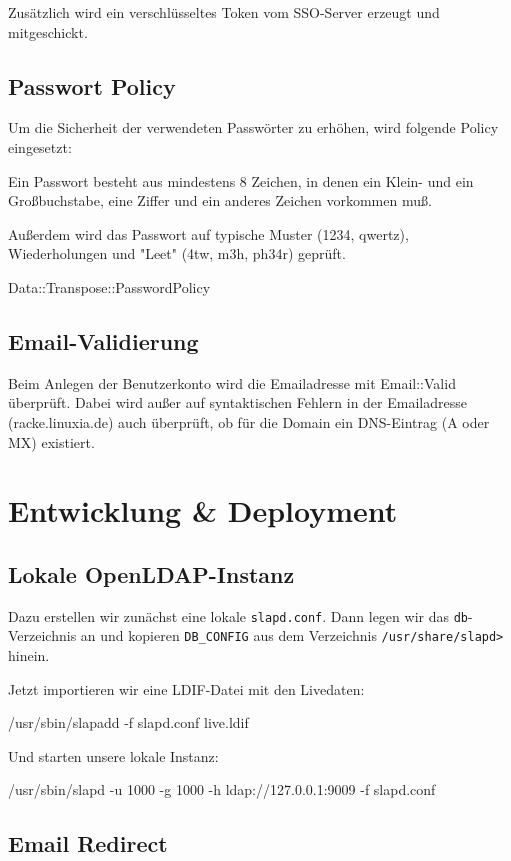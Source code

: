 Zusätzlich wird ein verschlüsseltes Token vom SSO-Server
erzeugt und mitgeschickt.                       
                       
\subsection{Passwort Policy}

Um die Sicherheit der verwendeten Passwörter zu erhöhen, wird
folgende Policy eingesetzt:

Ein Passwort besteht aus mindestens 8 Zeichen, in denen
ein Klein- und ein Großbuchstabe, eine Ziffer und ein
anderes Zeichen vorkommen muß.

Außerdem wird das Passwort auf typische Muster (1234, qwertz),
Wiederholungen und "Leet" (4tw, m3h, ph34r) geprüft.

Data::Transpose::PasswordPolicy

\subsection{Email-Validierung}

Beim Anlegen der Benutzerkonto wird die Emailadresse
mit Email::Valid überprüft. Dabei wird außer auf
syntaktischen Fehlern in der Emailadresse (racke.linuxia.de)
auch überprüft, ob für die Domain ein DNS-Eintrag (A oder MX)
existiert.                       

\section{Entwicklung \& Deployment}

\subsection{Lokale OpenLDAP-Instanz}

Dazu erstellen wir zunächst eine lokale \verb|slapd.conf|. Dann legen
wir das \verb|db|-Verzeichnis an und kopieren \verb|DB_CONFIG| aus dem
Verzeichnis \verb|/usr/share/slapd>| hinein.

Jetzt importieren wir eine LDIF-Datei mit den Livedaten:

    /usr/sbin/slapadd -f slapd.conf live.ldif

Und starten unsere lokale Instanz:

    /usr/sbin/slapd -u 1000 -g 1000 -h ldap://127.0.0.1:9009 -f slapd.conf

\subsection{Email Redirect}

